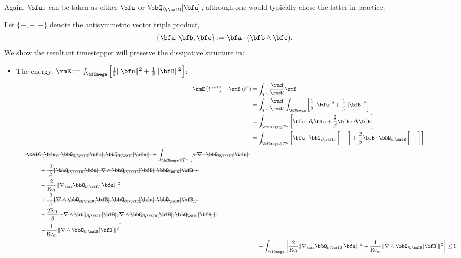     Again, $\bfu_{*}$ can be taken as either $\bfu$ or $\bbQ_{\partial_{t}\calU}[\bfu]$, although one would typically chose the latter in practice.

    \shortline

    Let $\{-, -, -\}$ denote the antisymmetric vector triple product,
    \begin{equation}
        \{\bfa, \bfb, \bfc\}  :=  \bfa\cdot(\bfb\wedge\bfc).
    \end{equation}
    We show the resultant timestepper will preserve the dissipative structure in:
    \begin{itemize}
        \item  The energy, $\rmE  :=  \int_{\bfOmega}\left[\frac{1}{2}\|\bfu\|^{2} + \frac{1}{\beta}\|\bfB\|^{2}\right]$:
        \begin{align}
                \rmE\left(t^{n + 1}\right) - \rmE\left(t^{n}\right)
                &=  \int_{T^{n}}\frac{\rmd}{\rmd t}\rmE  \\
                &=  \int_{T^{n}}\frac{\rmd}{\rmd t}\int_{\bfOmega}\left[\frac{1}{2}\|\bfu\|^{2} + \frac{1}{\beta}\|\bfB\|^{2}\right]  \\
                &=  \int_{\bfOmega\otimes T^{n}}\left[\bfu\cdot\partial_{t}\bfu + \frac{2}{\beta}\bfB\cdot\partial_{t}\bfB\right]  \\
                &=  \int_{\bfOmega\otimes T^{n}}\left[\bfu\cdot\bbQ_{\partial_{t}\calU}\left[\cdots\tall\right] + \frac{2}{\beta}\bfB\cdot\bbQ_{\partial_{t}\calB}\left[\cdots\tall\right]\right]  \\
            \begin{split}
                &=  \mst{\calC\left[\bfu_{*}; \bbQ_{\partial_{t}\calU}[\bfu], \bbQ_{\partial_{t}\calU}[\bfu]\right]} + \int_{\bfOmega\otimes T^{n}}\left[p\mst{\nabla\cdot\bbQ_{\partial_{t}\calU}[\bfu]}\tall\right.  \\
                &\qquad\qquad+ \mst{\frac{2}{\beta}\{\bbQ_{\partial_{t}\calU}[\bfu], \nabla\wedge\bbQ_{\partial_{t}\calB}[\bfB], \bbQ_{\calG}[\bfB]\}}  \\
                &\qquad\qquad- \frac{2}{\rmRef}\|\nabla_{\rms}\bbQ_{\partial_{t}\calU}[\bfu]\|^{2}  \\
                &\qquad\qquad+ \mst{\frac{2}{\beta}\{\nabla\wedge\bbQ_{\partial_{t}\calB}[\bfB], \bbQ_{\partial_{t}\calU}[\bfu], \bbQ_{\calG}[\bfB]\}}  \\
                &\qquad\qquad+ \frac{2\rmRH}{\beta}\mst{\{\nabla\wedge\bbQ_{\partial_{t}\calB}[\bfB], \nabla\wedge\bbQ_{\partial_{t}\calB}[\bfB], \bbQ_{\calG}[\bfB]\}}  \\
                &\qquad\qquad\left.- \frac{1}{\rmRem}\|\nabla\wedge\bbQ_{\partial_{t}\calB}[\bfB]\|^{2}\right]
            \end{split}  \\
                &=  - \int_{\bfOmega}\left[\frac{2}{\rmRef}\|\nabla_{\rms}\bbQ_{\partial_{t}\calU}[\bfu]\|^{2} + \frac{1}{\rmRem}\|\nabla\wedge\bbQ_{\partial_{t}\calB}[\bfB]\|^{2}\right]  \leq  0
        \end{align}
        

\end{itemize}
